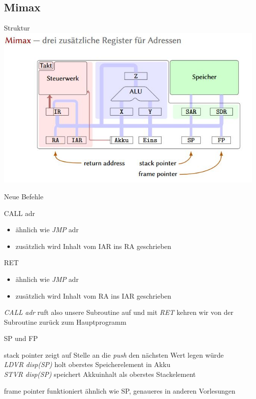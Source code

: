 \subsection{Mimax}

\begin{frame}{Struktur}
	\centering
	\includegraphics[width=\textwidth]{../topics/mimax/mimax_structure.jpg} 
\end{frame}

\begin{frame}{Neue Befehle}
	\begin{block}{CALL adr}
			\begin{itemize}
				\item ähnlich wie \emph{JMP} adr
				\item zusätzlich wird Inhalt vom IAR ins RA geschrieben
			\end{itemize}
		\end{block}
		
		\begin{block}{RET}
			\begin{itemize}
				\item ähnlich wie \emph{JMP} adr
				\item zusätzlich wird Inhalt vom RA ins IAR geschrieben
			\end{itemize}			
		\end{block}
	\emph{CALL adr} ruft also unsere Subroutine auf und mit \emph{RET} kehren wir von der Subroutine zurück zum Hauptprogramm
	\end{frame}

\begin{frame}{SP und FP}
	\begin{block}{stack pointer}
		zeigt auf Stelle an die \emph{push} den nächsten Wert legen würde\\
		\emph{LDVR disp(SP)} holt oberstes Speicherelement in Akku\\
		\emph{STVR disp(SP)} speichert Akkuinhalt als oberstes Stackelement	
	\end{block}
	\begin{block}{frame pointer}
			funktioniert ähnlich wie SP, genaueres in anderen Vorlesungen
	\end{block}
\end{frame}

